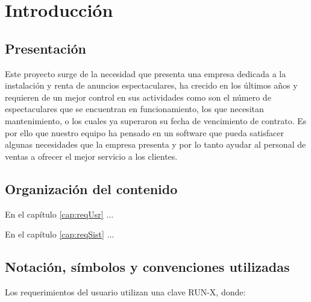 \chapter{Introducción}
\section{Presentación}
Este proyecto surge de la necesidad que presenta una empresa dedicada a la instalación y renta de anuncios espectaculares, ha crecido en los últimos años y requieren de un mejor control en sus actividades como son el número de espectaculares que se encuentran en funcionamiento, los que necesitan mantenimiento, o los cuales ya superaron su fecha de vencimiento de contrato.
Es por ello que nuestro equipo ha pensado en un software  que pueda satisfacer algunas necesidades que la empresa presenta y por lo tanto ayudar al personal de ventas a ofrecer el mejor servicio a los clientes.


%	
	
\section{Organización del contenido}

	En el capítulo \ref{cap:reqUsr} ...
	
	En el capítulo \ref{cap:reqSist} ...

\section{Notación, símbolos y convenciones utilizadas}

Los requerimientos del usuario utilizan una clave RUN-X, donde:
	
